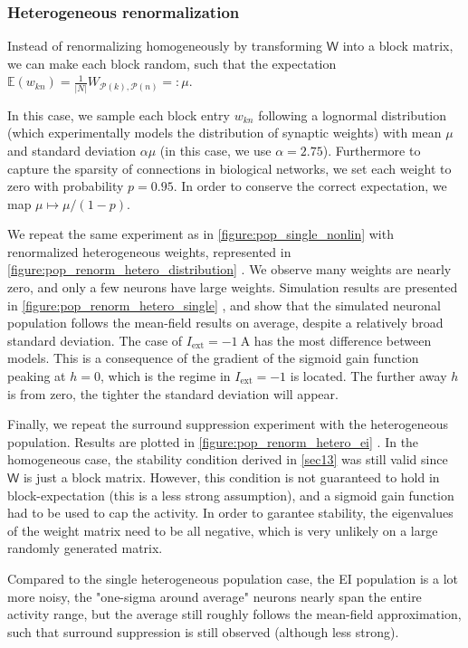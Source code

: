 \documentclass[10pt,conference,compsocconf,a4paper]{IEEEtran}
\newcommand{\nunit}[1]{\ \si{#1}}
\newcommand*{\shortautoref}[1]{%
	\begingroup
	\def\equationautorefname{\textsc{Eq.}}%
	\def\tableautorefname{\textsc{Tab.}}%
	\def\figureautorefname{\textsc{Fig.}}%
	\autoref{#1}%
	\endgroup
}
\begin{document}
		\subsubsection{Heterogeneous renormalization}

			Instead of renormalizing homogeneously by transforming $\mathsf W$ into a block matrix, we can make each block random, such that the expectation $\mathbb E(w_{kn}) = \frac{1}{|N|} W_{\mathcal P(k),\mathcal P(n)} =: \mu$.
			
			In this case, we sample each block entry $w_{kn}$ following a lognormal distribution (which experimentally models the distribution of synaptic weights) with mean $\mu$ and standard deviation $\alpha \mu$ (in this case, we use $\alpha = 2.75$).
			Furthermore to capture the sparsity of connections in biological networks, we set each weight to zero with probability $p=0.95$. In order to conserve the correct expectation, we map $\mu \mapsto \mu/(1-p)$.

			We repeat the same experiment as in \shortautoref{figure:pop_single_nonlin} with renormalized heterogeneous weights, represented in \shortautoref{figure:pop_renorm_hetero_distribution}. We observe many weights are nearly zero, and only a few neurons have large weights. Simulation results are presented in \shortautoref{figure:pop_renorm_hetero_single}, and show that the simulated neuronal population follows the mean-field results on average, despite a relatively broad standard deviation. The case of $I_{\text{ext}} = -1 \nunit{\ampere}$ has the most difference between models. This is a consequence of the gradient of the sigmoid gain function peaking at $h = 0$, which is the regime in $I_{\text{ext}} = -1$ is located. The further away $h$ is from zero, the tighter the standard deviation will appear.

			Finally, we repeat the surround suppression experiment with the heterogeneous population. Results are plotted in \shortautoref{figure:pop_renorm_hetero_ei}. In the homogeneous case, the stability condition derived in \shortautoref{sec13} was still valid since $\mathsf W$ is just a block matrix. However, this condition is not guaranteed to hold in block-expectation (this is a less strong assumption), and a sigmoid gain function had to be used to cap the activity. In order to garantee stability, the eigenvalues of the weight matrix need to be all negative, which is very unlikely on a large randomly generated matrix.

			Compared to the single heterogeneous population case, the EI population is a lot more noisy, the "one-sigma around average" neurons nearly span the entire activity range, but the average still roughly follows the mean-field approximation, such that surround suppression is still observed (although less strong).
\end{document}
